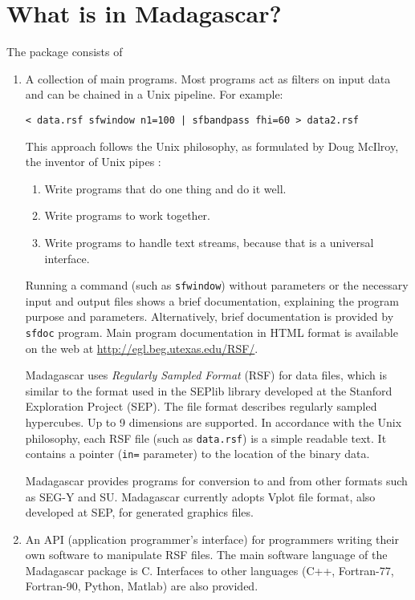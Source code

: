 \section{What is in Madagascar?}

The package consists of
\begin{enumerate}
\item A collection of main programs. Most programs act as filters on input
  data and can be chained in a Unix pipeline. For example:
\begin{verbatim}
< data.rsf sfwindow n1=100 | sfbandpass fhi=60 > data2.rsf
\end{verbatim}
This approach follows the Unix philosophy, as formulated by Doug McIlroy,
the inventor of Unix pipes \cite[]{salus}:
\begin{enumerate}
\item Write programs that do one thing and do it well. 
\item Write programs to work together. 
\item Write programs to handle text streams, because that is a universal
  interface.
\end{enumerate}

Running a command (such as \texttt{sfwindow}) without parameters or the
necessary input and output files shows a brief documentation, explaining the
program purpose and parameters.  Alternatively, brief documentation is
provided by \texttt{sfdoc} program. Main program documentation in HTML format
is available on the web at \url{http://egl.beg.utexas.edu/RSF/}.

Madagascar uses \emph{Regularly Sampled Format} (RSF) for data files,
which is similar to the format used in the SEPlib library developed at
the Stanford Exploration Project (SEP). The file format describes
regularly sampled hypercubes. Up to 9 dimensions are supported. In
accordance with the Unix philosophy, each RSF file (such as
\texttt{data.rsf}) is a simple readable text. It contains a pointer
(\texttt{in=} parameter) to the location of the binary data.

Madagascar provides programs for conversion to and from other formats
such as SEG-Y and SU. Madagascar currently adopts Vplot file format,
also developed at SEP, for generated graphics files.

\item An API (application programmer's interface) for programmers writing
  their own software to manipulate RSF files. The main software language of
  the Madagascar package is C. Interfaces to other languages (C++, Fortran-77,
  Fortran-90, Python, Matlab) are also provided.
  

\end{enumerate}
